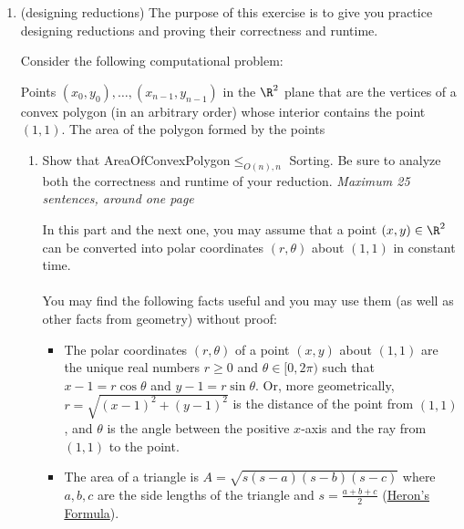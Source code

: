 \documentclass[11pt]{article}
\begin{document}
\begin{enumerate}
     \item  (designing reductions) 
     The purpose of this exercise is to give you practice designing reductions and proving their correctness and runtime.

    Consider the following computational problem:

    {Points $(x_0,y_0),\ldots,(x_{n-1},y_{n-1})$ in the $\R^2$ plane that are the vertices of a convex polygon (in an arbitrary order) whose interior contains the point $(1,1)$.}
    {The area of the polygon formed by the points}

    \begin{enumerate}
        \item \label{part:polar} 
        Show that AreaOfConvexPolygon$\leq_{O(n),n}$ Sorting.  Be sure to analyze both the correctness and runtime of your reduction. \textit{Maximum 25 sentences, around one page}

        In this part and the next one, you may assume that a point $(x,y)\in \R^2$ can be converted into polar coordinates $(r,\theta)$ about $(1,1)$ in constant time. 
        \\\\
        You may find the following facts useful and you may use them (as well as other facts from geometry) without proof:
        \begin{itemize}
            \item The polar coordinates $(r,\theta)$ of a point $(x,y)$ about $(1,1)$ are the unique real numbers $r\geq 0$ and $\theta\in [0,2\pi)$ such that $x-1=r\cos \theta$ and $y-1=r\sin \theta$. Or, more geometrically, $r=\sqrt{(x-1)^2+(y-1)^2}$ is the distance of the point from $(1,1)$, and $\theta$ is the angle between the positive $x$-axis and the ray from $(1,1)$ to the point.
            \item The area of a triangle is $A = \sqrt{s(s-a)(s-b)(s-c)}$ where $a, b, c$ are the side lengths of the triangle and $s = \frac{a + b + c}{2}$ (\href{https://en.wikipedia.org/wiki/Heron\%27s_formula}{Heron's Formula}).
        \end{itemize}

        \begin{mysolution}


\end{mysolution}
\end{enumerate}
\end{enumerate}
\end{document}
